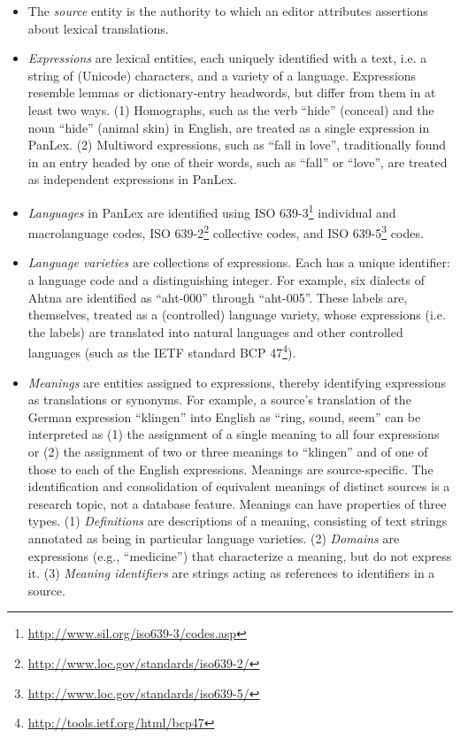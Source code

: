 \documentclass[sw]{iosart2c}
\begin{document}
\begin{itemize}
  \item The \emph{source} entity is the authority to which an editor attributes assertions about lexical translations.
  \item \emph{Expressions} are lexical entities, each uniquely identified with a text, i.e. a string of (Unicode) characters, and a variety of a language. Expressions resemble lemmas or dictionary-entry headwords, but differ from them in at least two ways. (1) Homographs, such as the verb ``hide'' (conceal) and the noun ``hide'' (animal skin) in English, are treated as a single expression in PanLex. (2) Multiword expressions, such as ``fall in love'', traditionally found in an entry headed by one of their words, such as ``fall'' or ``love'', are treated as independent expressions in PanLex.
    \item \emph{Languages} in PanLex are identified using ISO 639-3\footnote{\url{http://www.sil.org/iso639-3/codes.asp}} individual and macrolanguage codes, ISO 639-2\footnote{\url{http://www.loc.gov/standards/iso639-2/}} collective codes, and ISO 639-5\footnote{\url{http://www.loc.gov/standards/iso639-5/}} codes.
    \item \emph {Language varieties} are collections of expressions. Each has a unique identifier: a language code and a distinguishing integer. For example, six dialects of Ahtna are identified as ``aht-000'' through ``aht-005''. These labels are, themselves, treated as a (controlled) language variety, whose expressions (i.e. the labels) are translated into natural languages and other controlled languages (such as the IETF standard BCP 47\footnote{\url{http://tools.ietf.org/html/bcp47}}).
    \item \emph{Meanings} are entities assigned to expressions, thereby identifying expressions as translations or synonyms. For example, a source's translation of the German expression ``klingen'' into English as ``ring, sound, seem'' can be interpreted as (1) the assignment of a single meaning to all four expressions or (2) the assignment of two or three meanings to ``klingen'' and of one of those to each of the English expressions. Meanings are source-specific. The identification and consolidation of equivalent meanings of distinct sources is a research topic, not a database feature. Meanings can have properties of three types. (1) \emph{Definitions} are descriptions of a meaning, consisting of text strings annotated as being in particular language varieties. (2) \emph{Domains} are expressions (e.g., ``medicine'') that characterize a meaning, but do not express it. (3) \emph{Meaning identifiers} are strings acting as references to identifiers in a source.

\end{itemize}
\end{document}
